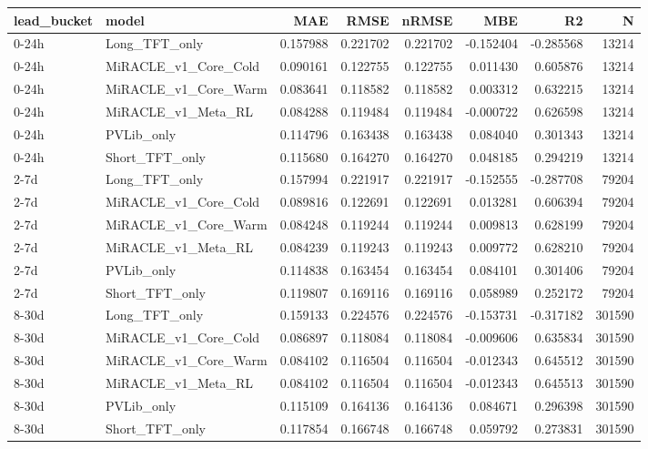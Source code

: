 \begin{tabular}{llrrrrrr}
\toprule
lead_bucket & model & MAE & RMSE & nRMSE & MBE & R2 & N \\
\midrule
0-24h & Long_TFT_only & 0.157988 & 0.221702 & 0.221702 & -0.152404 & -0.285568 & 13214 \\
0-24h & MiRACLE_v1_Core_Cold & 0.090161 & 0.122755 & 0.122755 & 0.011430 & 0.605876 & 13214 \\
0-24h & MiRACLE_v1_Core_Warm & 0.083641 & 0.118582 & 0.118582 & 0.003312 & 0.632215 & 13214 \\
0-24h & MiRACLE_v1_Meta_RL & 0.084288 & 0.119484 & 0.119484 & -0.000722 & 0.626598 & 13214 \\
0-24h & PVLib_only & 0.114796 & 0.163438 & 0.163438 & 0.084040 & 0.301343 & 13214 \\
0-24h & Short_TFT_only & 0.115680 & 0.164270 & 0.164270 & 0.048185 & 0.294219 & 13214 \\
2-7d & Long_TFT_only & 0.157994 & 0.221917 & 0.221917 & -0.152555 & -0.287708 & 79204 \\
2-7d & MiRACLE_v1_Core_Cold & 0.089816 & 0.122691 & 0.122691 & 0.013281 & 0.606394 & 79204 \\
2-7d & MiRACLE_v1_Core_Warm & 0.084248 & 0.119244 & 0.119244 & 0.009813 & 0.628199 & 79204 \\
2-7d & MiRACLE_v1_Meta_RL & 0.084239 & 0.119243 & 0.119243 & 0.009772 & 0.628210 & 79204 \\
2-7d & PVLib_only & 0.114838 & 0.163454 & 0.163454 & 0.084101 & 0.301406 & 79204 \\
2-7d & Short_TFT_only & 0.119807 & 0.169116 & 0.169116 & 0.058989 & 0.252172 & 79204 \\
8-30d & Long_TFT_only & 0.159133 & 0.224576 & 0.224576 & -0.153731 & -0.317182 & 301590 \\
8-30d & MiRACLE_v1_Core_Cold & 0.086897 & 0.118084 & 0.118084 & -0.009606 & 0.635834 & 301590 \\
8-30d & MiRACLE_v1_Core_Warm & 0.084102 & 0.116504 & 0.116504 & -0.012343 & 0.645512 & 301590 \\
8-30d & MiRACLE_v1_Meta_RL & 0.084102 & 0.116504 & 0.116504 & -0.012343 & 0.645513 & 301590 \\
8-30d & PVLib_only & 0.115109 & 0.164136 & 0.164136 & 0.084671 & 0.296398 & 301590 \\
8-30d & Short_TFT_only & 0.117854 & 0.166748 & 0.166748 & 0.059792 & 0.273831 & 301590 \\
\bottomrule
\end{tabular}
